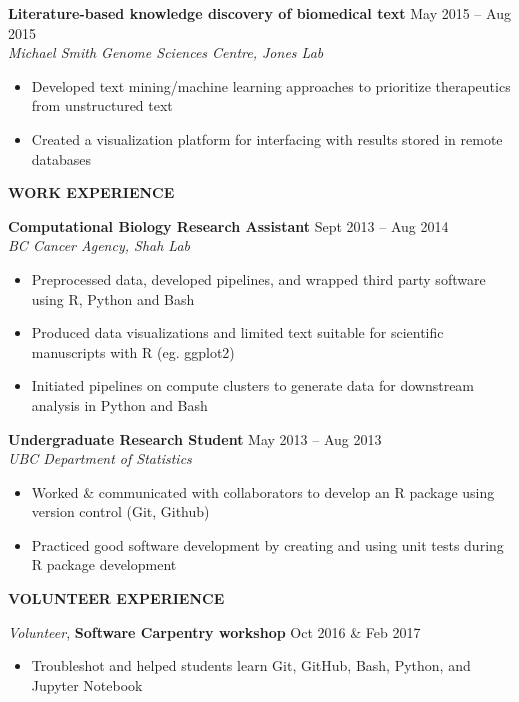 \documentclass{res}
\renewcommand{\section}[1]{%
  \vspace{0.3in}%
  \centerline{\uppercase{\bf{#1}}}%
  \vspace{-6pt}}
\newcommand{\linehead}[2]{%
  {\bf #1} \hfill #2\\}
\newcommand{\linetitle}[1]{%
  {\sl #1}}
\newcommand{\linevolunteer}[3]{%
  {\sl #3}, {\bf #2} \hfill #1}%
\begin{document}
\begin{resume}
\linehead{Literature-based knowledge discovery of biomedical text}{May 2015 -- Aug 2015}
\linetitle{Michael Smith Genome Sciences Centre, Jones Lab}
\begin{itemize}
  \item Developed text mining/machine learning approaches to prioritize therapeutics from unstructured text
  \item Created a visualization platform for interfacing with results stored in remote databases
\end{itemize}

\vspace{-1em}
\section{Work Experience}

{\bf Computational Biology Research Assistant} \hfill Sept 2013 -- Aug 2014\\
{\it BC Cancer Agency, Shah Lab}
\begin{itemize}
  \item Preprocessed data, developed pipelines, and wrapped third party software using R, Python and Bash
  \item Produced data visualizations and limited text suitable for scientific manuscripts with R (eg. ggplot2)
  \item Initiated pipelines on compute clusters to generate data for downstream analysis in Python and Bash
\end{itemize}

{\bf Undergraduate Research Student} \hfill May 2013 -- Aug 2013\\
{\it UBC Department of Statistics}
\begin{itemize}
  \item Worked \& communicated with collaborators to develop an R package using version control (Git, Github)
  \item Practiced good software development by creating and using unit tests during R package development
\end{itemize}

\vspace{-1em}
\section{Volunteer experience}
\linevolunteer{Oct 2016 \& Feb 2017}{%
  Software Carpentry workshop}{%
  Volunteer}
\begin{itemize}
  \item Troubleshot and helped students learn Git, GitHub, Bash, Python, and Jupyter Notebook
\end{itemize}


\end{resume}
\end{document}

